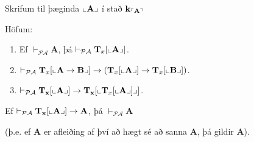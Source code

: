 \documentclass[12pt]{book}
\newcommand{\PA}{\mathcal{PA}}
\newcommand{\bA}{\mathbf{A}}
\newcommand{\bB}{\mathbf{B}}
\newcommand{\bT}{\mathbf{T}}
\newcommand{\bx}{\mathbf{x}}
\newcommand{\bk}{\mathbf{k}}
\newcommand{\vP}{\vdash_{\PA}}
\DeclarePairedDelimiter{\god}{\ulcorner}{\urcorner}
\DeclarePairedDelimiter{\pg}{\llcorner}{\lrcorner}
\begin{document}
Skrifum til þæginda $\pg{\bA}$ í stað $\bk_{\god{\bA}}$

\begin{setn}
  Höfum:
\begin{enumerate}[label=\textbf{HBL\arabic*}]
  \item Ef $\vdash_{\PA} \bA$, þá $\vP \bT_{x} [\pg{\bA}]$.
  \item $\vP \bT_x [\pg{\bA \to \bB}] \to (\bT_x[\pg{\bA}] \to \bT_x[\pg{\bB}])$.
  
  \item $\vP \bT_{\bx}[\pg{\bA}] \to \bT_{\bx}[ \pg{\bT_x[\pg{\bA}]}]$.
  \end{enumerate}
\end{setn}

\begin{setn}[Löb]
  Ef $ \vP \bT_{\bx}[\pg{\bA}] \to \bA$, þá $\vP \bA$
  
(þ.e. ef $\bA$ er afleiðing af því að hægt sé að sanna $\bA$, þá gildir $\bA$).
\end{setn}
\end{document}
